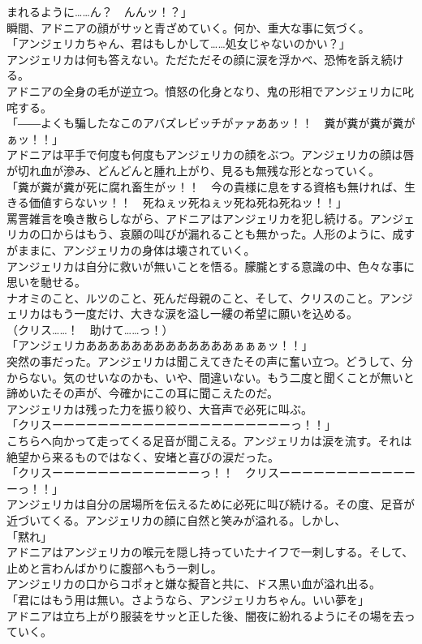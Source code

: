 \documentclass[b5j,10pt,openany]{jsbook}
\begin{document}
まれるように\ldots{}\ldots{}ん？　んんッ！？」\\瞬間、アドニアの顔がサッと青ざめていく。何か、重大な事に気づく。\\「アンジェリカちゃん、君はもしかして\ldots{}\ldots{}処女じゃないのかい？」\\アンジェリカは何も答えない。ただただその顔に涙を浮かべ、恐怖を訴え続ける。\\アドニアの全身の毛が逆立つ。憤怒の化身となり、鬼の形相でアンジェリカに叱咤する。\\「――よくも騙したなこのアバズレビッチがァァああッ！！　糞が糞が糞が糞がぁッ！！」\\アドニアは平手で何度も何度もアンジェリカの顔をぶつ。アンジェリカの顔は唇が切れ血が滲み、どんどんと腫れ上がり、見るも無残な形となっていく。\\「糞が糞が糞が死に腐れ畜生がッ！！　今の貴様に息をする資格も無ければ、生きる価値すらないッ！！　死ねぇッ死ねぇッ死ね死ね死ねッ！！」\\罵詈雑言を喚き散らしながら、アドニアはアンジェリカを犯し続ける。アンジェリカの口からはもう、哀願の叫びが漏れることも無かった。人形のように、成すがままに、アンジェリカの身体は壊されていく。\\アンジェリカは自分に救いが無いことを悟る。朦朧とする意識の中、色々な事に思いを馳せる。\\ナオミのこと、ルツのこと、死んだ母親のこと、そして、クリスのこと。アンジェリカはもう一度だけ、大きな涙を溢し一縷の希望に願いを込める。\\（クリス\ldots{}\ldots{}！　助けて\ldots{}\ldots{}っ！）\\「アンジェリカあああああああああああああぁぁぁッ！！」\\突然の事だった。アンジェリカは聞こえてきたその声に奮い立つ。どうして、分からない。気のせいなのかも、いや、間違いない。もう二度と聞くことが無いと諦めいたその声が、今確かにこの耳に聞こえたのだ。\\アンジェリカは残った力を振り絞り、大音声で必死に叫ぶ。\\「クリスーーーーーーーーーーーーーーーーーーーーーっ！！」\\こちらへ向かって走ってくる足音が聞こえる。アンジェリカは涙を流す。それは絶望から来るものではなく、安堵と喜びの涙だった。\\「クリスーーーーーーーーーーーーーっ！！　クリスーーーーーーーーーーーーーっ！！」\\アンジェリカは自分の居場所を伝えるために必死に叫び続ける。その度、足音が近づいてくる。アンジェリカの顔に自然と笑みが溢れる。しかし、\\「黙れ」\\アドニアはアンジェリカの喉元を隠し持っていたナイフで一刺しする。そして、止めと言わんばかりに腹部へもう一刺し。\\アンジェリカの口からコポォと嫌な擬音と共に、ドス黒い血が溢れ出る。\\「君にはもう用は無い。さようなら、アンジェリカちゃん。いい夢を」\\アドニアは立ち上がり服装をサッと正した後、闇夜に紛れるようにその場を去っていく。
\end{document}
